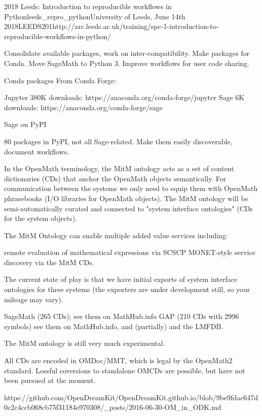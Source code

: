 \begin{Aim 1}
\begin{Aim 2}
\begin{event}{2018 Leeds: Introduction to reproducible workflows in Python}{leeds_repro_python}{University of Leeds, June 14th 2018}{LEEDS}{20}{1}{http://arc.leeds.ac.uk/training/spc-1-introduction-to-reproducible-workflows-in-python/}
\begin{itemize}
         Consolidate available packages, work on inter-compatibility.
         Make packages for Conda.
         Move SageMath to Python 3.
         Improve workflows for user code sharing.

         Conda packages From Conda Forge:

         Jupyter 380K downloads: https://anaconda.org/conda-forge/jupyter
         Sage 6K downloads: https://anaconda.org/conda-forge/sage

         Sage on PyPI

         80 packages in PyPI, not all Sage-related.
         Make them easily discoverable, document workflows.

In the OpenMath terminology, the MitM ontology acts as a set of content dictionaries (CDs) that anchor the OpenMath objects semantically. For communication between the systems we only need to equip them with OpenMath phrasebooks (I/O libraries for OpenMath objects). The MitM ontology will be semi-automatically curated and connected to "system interface ontologies" (CDs for the system objects).

The MitM Ontology can enable multiple added value services including:

    remote evaluation of mathematical expressions via SCSCP
    MONET-style service discovery via the MitM CDs.

The current state of play is that we have initial exports of system interface ontologies for three systems (the exporters are under development still, so your mileage may vary).

    SageMath (265 CDs); see them on MathHub.info
    GAP (210 CDs with 2996 symbols) see them on MathHub.info, and
    (partially) and the LMFDB.

The MitM ontology is still very much experimental.

All CDs are encoded in OMDoc/MMT, which is legal by the OpenMath2 standard. Lossful coversions to standalone OMCDs are possible, but have not been pursued at the moment.

https://github.com/OpenDreamKit/OpenDreamKit.github.io/blob/9be9fdac647d0c2c4ccb068cb75f31184e970308/_posts/2016-06-30-OM_in_ODK.md



\end{itemize}
\end{event}
\end{Aim 2}
\end{Aim 1}
